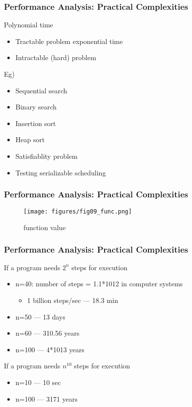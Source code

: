 \documentclass[newPxFont,sthlmFooter,nooffset]{beamer}
\begin{document}
\begin{frame}[t]
  \frametitle{Performance Analysis: Practical Complexities}
Polynomial time
\begin{itemize}
\item Tractable problem exponential time
\item Intractable (hard) problem
\end{itemize}

Eg)
\begin{itemize}
\item Sequential search
\item Binary search
\item Insertion sort
\item Heap sort
\item Satisfiablity problem
\item Testing serializable scheduling
\end{itemize}

\end{frame}



\begin{frame}[t]
  \frametitle{Performance Analysis: Practical Complexities}

  \begin{figure}[h]
    \centering
    \texttt{[image: figures/fig09\_func.png]}
    \caption{function value}
  \end{figure}
\end{frame}


\begin{frame}[t]
  \frametitle{Performance Analysis: Practical Complexities}

If a program needs $2^n$ steps for execution
\begin{itemize}
\item n=40: number of steps = 1.1*1012 in computer systems
  \begin{itemize}
  \item 1 billion steps/sec --- 18.3 min
  \end{itemize}
\item n=50 --- 13 days
\item n=60 --- 310.56 years
\item n=100 --- 4*1013 years
\end{itemize}

If a program needs $n^{10}$ steps for execution
\begin{itemize}
\item n=10 --- 10 sec
\item n=100 --- 3171 years
\end{itemize}

\end{frame}
\end{document}
